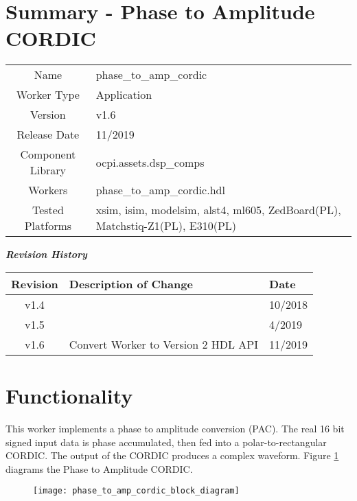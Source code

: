 \documentclass{article}
\author{} %
\date{Version \docVersion} %
\title{\docTitle}
\def\docVersion{1.6}
\def\comp{phase\_to\_amp\_cordic}
\def\Comp{Phase to Amplitude CORDIC}
\begin{document}
\section*{Summary - \Comp}
\begin{tabular}{|c|M{13.5cm}|}
	\hline
	                  &                                                    \\
	\hline
	Name              & \comp                                              \\
	\hline
	Worker Type       & Application                                        \\
	\hline
	Version           & v\docVersion \\
	\hline
	Release Date      & 11/2019 \\
	\hline
	Component Library & ocpi.assets.dsp\_comps                              \\
	\hline
	Workers           & \comp.hdl                                          \\
	\hline
	Tested Platforms  & xsim, isim, modelsim, alst4, ml605, ZedBoard(PL), Matchstiq-Z1(PL), E310(PL) \\
	\hline
\end{tabular}

\begin{center}
	\textit{\textbf{Revision History}}
	\begin{table}[H]
	\label{table:revisions} %
		\begin{tabularx}{\textwidth}{|c|X|l|}
		\hline
		\rowcolor{blue}
		\textbf{Revision} & \textbf{Description of Change} & \textbf{Date} \\
		\hline
		v1.4 & & 10/2018 \\
		\hline
		v1.5 & & 4/2019\\
		\hline
		v1.6 & Convert Worker to Version 2 HDL API & 11/2019\\
		\hline
		\end{tabularx}
	\end{table}
\end{center}

\section*{Functionality}
\begin{flushleft}
	This worker implements a phase to amplitude conversion (PAC). The real 16 bit signed input data is phase accumulated, then fed into a polar-to-rectangular CORDIC. The output of the CORDIC produces a complex waveform. Figure \ref{fig:phase_to_amp_cordic} diagrams the Phase to Amplitude CORDIC.

	\begin{figure}[h]
		\centering\captionsetup{type=figure}\texttt{[image: phase\_to\_amp\_cordic\_block\_diagram]}
		\label{fig:phase_to_amp_cordic}
	\end{figure}
\end{flushleft}
\end{document}
